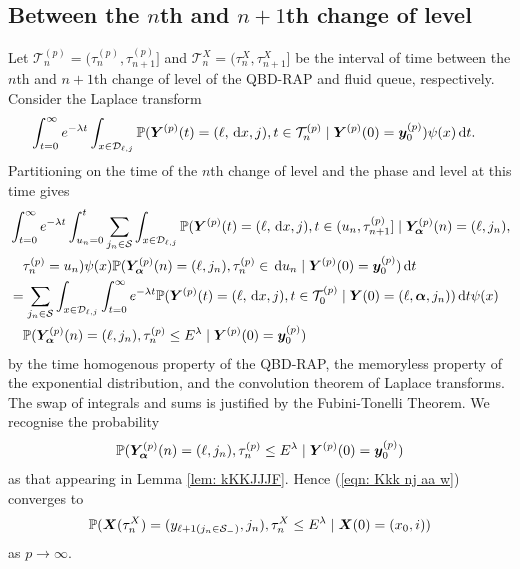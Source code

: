 \subsection{Between the \(n\)th and \(n+1\)th change of level}\label{sec: between n and np1}
Let \(\mathcal T_n^{(p)} = (\tau_{n}^{(p)},\tau_{n+1}^{(p)}]\) and \(\mathcal T_n^X=(\tau_n^X,\tau_{n+1}^X]\) be the interval of time between the \(n\)th and \(n+1\)th change of level of the QBD-RAP and fluid queue, respectively. Consider the Laplace transform 
\begin{align}
	\nonumber&\int_{t=0}^\infty e^{-\lambda t}\int_{x\in\mathcal{D}_{\ell,j}}\mathbb P({\boldsymbol Y}^{(p)}(t) = (\ell, \, \mathrm{d} x, j), t\in\mathcal T_n^{(p)} \mid 
	\boldsymbol Y^{(p)}(0)=\boldsymbol y_0^{(p)})\psi(x)\, \mathrm{d} t.
\end{align}
Partitioning on the time of the \(n\)th change of level and the phase and level at this time gives
\begin{align}
	&\int_{t=0}^\infty e^{-\lambda t} \int_{u_n=0}^t\sum_{j_n\in\mathcal S}
	\int_{x\in\mathcal{D}_{\ell,j}}\mathbb P({\boldsymbol Y}^{(p)}(t) = (\ell,\, \mathrm{d} x,j), 
	t \in(u_n, \tau_{n+1}^{(p)}] \mid\bm{Y}_{\bm{\alpha}}^{(p)}(n) = (\ell,j_n), \nonumber 
	\\&\quad \tau_{n}^{(p)}= u_n)\psi(x) \mathbb P(\bm{Y}_{\bm{\alpha}}^{(p)}(n) = (\ell, j_n), \tau_{n}^{(p)}\in \, \mathrm{d} u_n 
	 \mid \boldsymbol Y^{(p)}(0)=\boldsymbol y_0^{(p)}) 
	  \, \mathrm{d} t \nonumber 
	 \\&= \sum_{j_n\in\mathcal S}
	\int_{x\in\mathcal{D}_{\ell,j}} \int_{t=0}^\infty e^{-\lambda t} \mathbb P({\boldsymbol Y}^{(p)}(t) = (\ell,\, \mathrm{d} x, j), 
	t\in\mathcal T_{0}^{(p)} \mid\nonumber 
	  \boldsymbol Y(0) = (\ell,\boldsymbol\alpha,j_n))\, \mathrm{d} t \psi(x)  
	  \\&\quad{} \mathbb P(\bm{Y}_{\bm{\alpha}}^{(p)}(n) = (\ell,j_n), \tau_{n}^{(p)}\leq E^\lambda 
	 \mid \boldsymbol Y^{(p)}(0)=\boldsymbol y_0^{(p)}) \label{eqn: l whkrqvlkjbrd}
\end{align}
by the time homogenous property of the QBD-RAP, the memoryless property of the exponential distribution, and the convolution theorem of Laplace transforms. The swap of integrals and sums is justified by the Fubini-Tonelli Theorem. We recognise the probability 
\begin{align}
	\mathbb P(\bm{Y}_{\bm{\alpha}}^{(p)}(n) = (\ell, j_n), \tau_{n}^{(p)}\leq E^\lambda 
	 \mid \boldsymbol Y^{(p)}(0)=\boldsymbol y_0^{(p)}) \label{eqn: Kkk nj aa w}
\end{align}
as that appearing in Lemma \ref{lem: kKKJJJF}. Hence (\ref{eqn: Kkk nj aa w}) converges to 
\begin{align}
	\mathbb P(\boldsymbol X(\tau_n^X) = (y_{\ell+1(j_{n}\in\mathcal S_-)}, 
		j_n), \tau_{n}^X\leq E^\lambda
		\mid \boldsymbol X(0)=(x_0, i)) \label{eqn: ashverkjbvjhkhdsknacva}
\end{align}
as \(p\to\infty\). 

